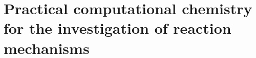 \chapter{Practical computational chemistry for the investigation of reaction
mechanisms}

\lipsum[1]

